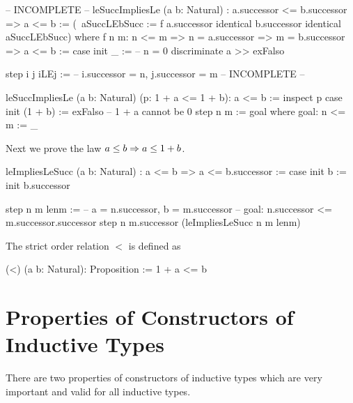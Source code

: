 \begin{alba}
    -- INCOMPLETE --
    leSuccImpliesLe
        (a b: Natural)
        : a.successor <= b.successor =>  a <= b
    :=
        (\ aSuccLEbSucc :=
            f a.successor identical b.successor identical aSuccLEbSucc)
        where
            f n m: n <= m => n = a.successor => m = b.successor => a <= b
            :=
                case
                    init _ :=
                        -- n = 0
                        discriminate a >> exFalso

                    step i j iLEj :=
                        -- i.successor = n, j.successor = m
                        -- INCOMPLETE --
\end{alba}


\begin{alba}
  leSuccImpliesLe (a b: Natural) (p: 1 + a <= 1 + b): a <= b :=
    inspect p case
      init (1 + b) :=
        exFalso      -- 1 + a cannot be 0
      step n m :=
        goal where
          goal: n <= m := _
\end{alba}


\noindent Next we prove the law $a \le b \Rightarrow a \le 1 + b$.

\begin{alba}
    leImpliesLeSucc
        (a b: Natural)
        :  a <= b  =>  a <= b.successor
    :=
        case
            init b :=
                init b.successor

            step n m lenm :=
                -- a = n.successor, b = m.successor
                -- goal: n.successor <= m.successor.successor
                step
                    n
                    m.successor
                    (leImpliesLeSucc n m lenm)
\end{alba}


\noindent The strict order relation $<$ is defined as

\begin{alba}
  (<) (a b: Natural): Proposition :=
    1 + a <= b
\end{alba}






\section{Properties of Constructors of Inductive Types}

There are two properties of constructors of inductive types which are very
important and valid for all inductive types.

